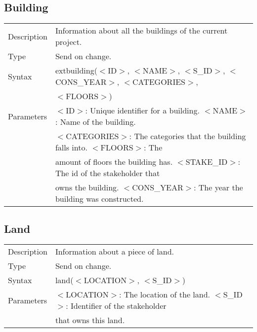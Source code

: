 \documentclass{article}
\begin{document}
\subsection*{Building}

\begin{tabular}{ l l }
  Description & Information about all the buildings of the current project.  \\
  Type & Send on change. \\
  Syntax & extbuilding($<$ID$>$, $<$NAME$>$, $<$S\_ID$>$, $<$CONS\_YEAR$>$, $<$CATEGORIES$>$, \\
    & $<$FLOORS$>$) \\
  Parameters &  $<$ID$>$: Unique identifier for a building. $<$NAME$>$ : Name of the building. \\
    & $<$CATEGORIES$>$: The categories that the building falls into. $<$FLOORS$>$:  The \\
    & amount of floors the building has. $<$STAKE\_ID$>$: The id of the stakeholder that \\
    & owns the building. $<$CONS\_YEAR$>$: The year the building was constructed.
\end{tabular}

\subsection*{Land}

\begin{tabular}{ l l }
  Description & Information about a piece of land.  \\
  Type & Send on change. \\
  Syntax & land($<$LOCATION$>$, $<$S\_ID$>$) \\
  Parameters &  $<$LOCATION$>$: The location of the land. $<$S\_ID$>$: Identifier of the stakeholder \\
    &  that owns this land.
\end{tabular}
\end{document}

